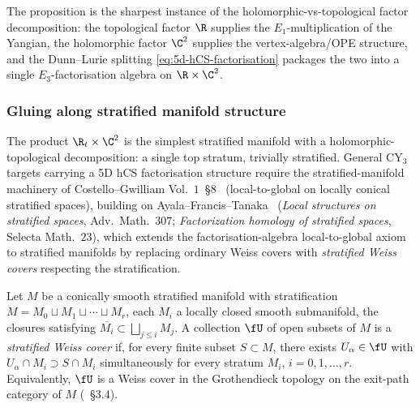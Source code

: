 The proposition is the sharpest instance of the
holomorphic-vs-topological factor decomposition: the topological factor
$\R$ supplies the $E_1$-multiplication of the Yangian, the holomorphic
factor $\C^2$ supplies the vertex-algebra/OPE structure, and the
Dunn--Lurie splitting \eqref{eq:5d-hCS-factorisation} packages the two
into a single $E_3$-factorisation algebra on $\R \times \C^2$.

\subsubsection{Gluing along stratified manifold structure}
\label{subsec:fa-stratified-gluing}

The product $\R_t \times \C^2$ is the simplest stratified manifold
with a holomorphic-topological decomposition: a single top stratum,
trivially stratified. General CY$_3$ targets carrying a 5D hCS
factorisation structure require the stratified-manifold machinery of
Costello--Gwilliam Vol.~$1$~\S$8$~\cite{CostelloGwilliam} (local-to-global
on locally conical stratified spaces), building on
Ayala--Francis--Tanaka~\cite{AyalaFrancisTanaka2017,AyalaFrancisTanaka2017Strat}
(\emph{Local structures on stratified spaces}, Adv.\ Math.~$307$;
\emph{Factorization homology of stratified spaces}, Selecta Math.~$23$),
which extends the factorisation-algebra local-to-global axiom to
stratified manifolds by replacing ordinary Weiss covers with
\emph{stratified Weiss covers} respecting the stratification.

\begin{definition}
\label{def:stratified-weiss-cover}
Let $M$ be a conically smooth stratified manifold with stratification
$M = M_0 \sqcup M_1 \sqcup \cdots \sqcup M_r$, each $M_i$ a locally
closed smooth submanifold, the closures satisfying
$\overline{M_i} \subset \bigsqcup_{j \le i} M_j$. A collection $\fU$
of open subsets of $M$ is a \emph{stratified Weiss cover} if, for
every finite subset $S \subset M$, there exists $U_\alpha \in \fU$
with $U_\alpha \cap M_i \supset S \cap M_i$ simultaneously for every
stratum $M_i$, $i = 0, 1, \ldots, r$. Equivalently, $\fU$ is a Weiss
cover in the Grothendieck topology on the exit-path category of $M$
(\cite{AyalaFrancisTanaka2017Strat}~\S$3.4$).
\end{definition}

